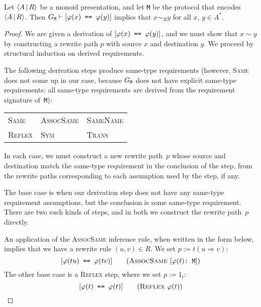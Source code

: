 \documentclass[../generics]{subfiles}
\begin{document}
\begin{theorem}\label{derivation to path}
Let $\langle A\,|\,R\rangle$ be a monoid presentation, and let \texttt{M} be the protocol that encodes $\langle A\,|\,R\rangle$. Then $G_\texttt{M}\vdash[\texttt{$\varphi(x)$ == $\varphi(y)$}]$ implies that $x\sim_R y$ for all $x$, $y\in A^*$.
\end{theorem}
\begin{proof}
We are given a derivation of $[\texttt{$\varphi(x)$ == $\varphi(y)$}]$, and we must show that $x\sim y$ by constructing a rewrite path $p$ with source $x$ and destination $y$. We proceed by structural induction on derived requirements.

The following derivation steps produce same-type requirements (however, \textsc{Same} does not come up in our case, because $G_\texttt{M}$ does not have explicit same-type requirements; all same-type requirements are derived from the requirement signature of~\texttt{M}):
\begin{center}
\begin{tabular}{lll}
\toprule
\textsc{Same}&\textsc{AssocSame}&\textsc{SameName}\\
\textsc{Reflex}&\textsc{Sym}&\textsc{Trans}\\
\bottomrule
\end{tabular}
\end{center}
In each case, we must construct a new rewrite path~$p$ whose source and destination match the same-type requirement in the conclusion of the step, from the rewrite paths corresponding to each assumption used by the step, if any.

\BaseCase The base case is when our derivation step does not have any same-type requirement assumptions, but the conclusion is some same-type requirement. There are two such kinds of steps, and in both we construct the rewrite path~$p$ directly.

An application of the \textsc{AssocSame} inference rule, when written in the form below, implies that we have a rewrite rule $(u,v)\in R$. We set $p:=t(u\Rightarrow v)$:
\[\SameReqPhi{tu}{tv}\tag{\textsc{AssocSame} $\ConfReqPhi{t}$}\]
The other base case is a \textsc{Reflex} step, where we set $p:=1_t$:
\[\SameReqPhi{t}{t}\tag{\textsc{Reflex} $\varphi(t)$}\]


\end{proof}
\end{document}
